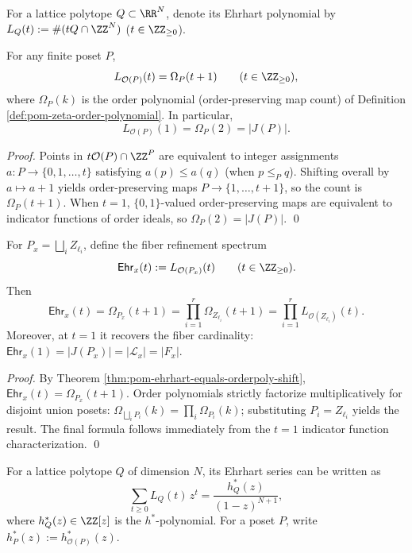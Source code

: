 \begin{definition}\label{def:pom-ehrhart-order-polytope}
For a lattice polytope \(Q\subset\RR^N\), denote its Ehrhart polynomial by
\(
L_Q(t):=\#(tQ\cap\ZZ^N)
\)
(\(t\in\ZZ_{\ge 0}\)).
\end{definition}

\begin{theorem}[Ehrhart count of order polytope = order polynomial (with shift)]\label{thm:pom-ehrhart-equals-orderpoly-shift}
For any finite poset \(P\),
\[
L_{\mathcal O(P)}(t)=\Omega_P(t+1)\qquad(t\in\ZZ_{\ge 0}),
\]
where \(\Omega_P(k)\) is the order polynomial (order-preserving map count) of Definition \ref{def:pom-zeta-order-polynomial}.
In particular,
\[
L_{\mathcal O(P)}(1)=\Omega_P(2)=|J(P)|.
\]
\end{theorem}
\begin{proof}
Points in \(t\mathcal O(P)\cap\ZZ^P\) are equivalent to integer assignments \(a:P\to\{0,1,\dots,t\}\) satisfying \(a(p)\le a(q)\) (when \(p\le_P q\)).
Shifting overall by \(a\mapsto a+1\) yields order-preserving maps \(P\to\{1,\dots,t+1\}\), so the count is \(\Omega_P(t+1)\).
When \(t=1\), \(\{0,1\}\)-valued order-preserving maps are equivalent to indicator functions of order ideals, so \(\Omega_P(2)=|J(P)|\). \qed
\end{proof}

\begin{corollary}\label{cor:pom-fiber-ehrhart-product}
For \(P_x=\bigsqcup_i Z_{\ell_i}\), define the fiber refinement spectrum
\[
\mathsf{Ehr}_x(t):=L_{\mathcal O(P_x)}(t)\qquad(t\in\ZZ_{\ge 0}).
\]
Then
\[
\mathsf{Ehr}_x(t)=\Omega_{P_x}(t+1)=\prod_{i=1}^r \Omega_{Z_{\ell_i}}(t+1)
=\prod_{i=1}^r L_{\mathcal O(Z_{\ell_i})}(t).
\]
Moreover, at \(t=1\) it recovers the fiber cardinality: \(\mathsf{Ehr}_x(1)=|J(P_x)|=|\mathcal L_x|=|F_x|\).
\end{corollary}
\begin{proof}
By Theorem \ref{thm:pom-ehrhart-equals-orderpoly-shift}, \(\mathsf{Ehr}_x(t)=\Omega_{P_x}(t+1)\).
Order polynomials strictly factorize multiplicatively for disjoint union posets: \(\Omega_{\bigsqcup_i P_i}(k)=\prod_i\Omega_{P_i}(k)\);
substituting \(P_i=Z_{\ell_i}\) yields the result. The final formula follows immediately from the \(t=1\) indicator function characterization. \qed
\end{proof}

\begin{definition}\label{def:pom-hstar-order-polytope}
For a lattice polytope \(Q\) of dimension \(N\), its Ehrhart series can be written as
\[
\sum_{t\ge 0} L_Q(t)\,z^t=\frac{h_Q^*(z)}{(1-z)^{N+1}},
\]
where \(h_Q^*(z)\in\ZZ[z]\) is the \(h^*\)-polynomial.
For a poset \(P\), write \(h_P^*(z):=h_{\mathcal O(P)}^*(z)\).
\end{definition}

